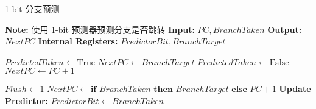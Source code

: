 \documentclass[lang=cn,a4paper,newtx]{elegantpaper}
\begin{document}
\begin{algorithm}[htbp]
  \caption{1-bit 分支预测}
  \label{alg:1bitBP}
  \begin{algorithmic}[1]
  \State \textbf{Note:} 使用 1-bit 预测器预测分支是否跳转
  \State \textbf{Input:} $PC, BranchTaken$
  \State \textbf{Output:} $NextPC$
  \State \textbf{Internal Registers:} $PredictorBit, BranchTarget$

          \State $PredictedTaken \gets \text{True}$
          \State $NextPC \gets BranchTarget$
      \Else
          \State $PredictedTaken \gets \text{False}$
          \State $NextPC \gets PC + 1$
      \EndIf
  \EndProcedure

        
          \State $Flush \gets 1$  
          \State $NextPC \gets \textbf{if } BranchTaken \textbf{ then } BranchTarget \textbf{ else } PC + 1$
      \EndIf
      \State \textbf{Update Predictor:}
      \State $PredictorBit \gets BranchTaken$  
  \EndProcedure
  \end{algorithmic}
\end{algorithm}
\end{document}
